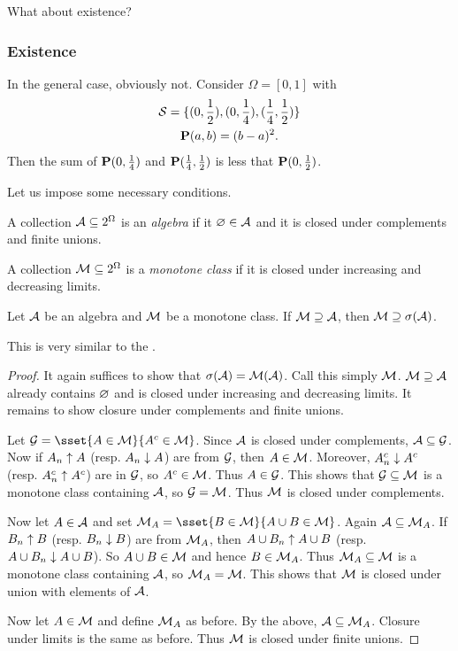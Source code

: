 What about existence?
\subsubsection{Existence}
In the general case, obviously not.
Consider $\Omega = [0, 1]$ with
\begin{gather*}
    \mcS = \set{(0, \frac12), (0, \frac14), (\frac14, \frac12)} \\
    \P(a, b) = (b - a)^2.
\end{gather*} Then the sum of $\P(0, \frac14)$ and $\P(\frac14, \frac12)$ is
less that $\P(0, \frac12)$.

Let us impose some necessary conditions.
\begin{definition*}[algebra] \label{def:algebra}
    A collection $\mcA \subseteq 2^\Omega$ is an \emph{algebra} if it
    $\O \in \mcA$ and it is closed under complements and finite unions.
\end{definition*}
\begin{definition*} \label{def:monotone-class}
    A collection $\mcM \subseteq 2^\Omega$ is a \emph{monotone class} if it
    is closed under increasing and decreasing limits.
\end{definition*}

\begin{proposition} \label{thm:monotone-algebra}
    Let $\mcA$ be an algebra and $\mcM$ be a monotone class.
    If $\mcM \supseteq \mcA$, then $\mcM \supseteq \sigma(\mcA)$.
\end{proposition}
This is very similar to the .
\begin{proof}
    It again suffices to show that $\sigma(\mcA) = \mcM(\mcA)$.
    Call this simply $\mcM$.
    $\mcM \supseteq \mcA$ already contains $\O$ and is closed under
    increasing and decreasing limits.
    It remains to show closure under complements and finite unions.

    Let $\mcG = \sset{A \in \mcM}{A^c \in \mcM}$.
    Since $\mcA$ is closed under complements, $\mcA \subseteq \mcG$.
    Now if $A_n \upto A$ (resp. $A_n \downto A$) are from $\mcG$,
    then $A \in \mcM$.
    Moreover, $A_n^c \downto A^c$ (resp. $A_n^c \upto A^c$) are in $\mcG$,
    so $A^c \in \mcM$.
    Thus $A \in \mcG$.
    This shows that $\mcG \subseteq \mcM$ is a monotone class containing
    $\mcA$, so $\mcG = \mcM$.
    Thus $\mcM$ is closed under complements.

    Now let $A \in \mcA$ and set
    $\mcM_A = \sset{B \in \mcM}{A \cup B \in \mcM}$.
    Again $\mcA \subseteq \mcM_A$.
    If $B_n \upto B$ (resp. $B_n \downto B$) are from $\mcM_A$,
    then $A \cup B_n \upto A \cup B$ (resp. $A \cup B_n \downto A \cup B$).
    So $A \cup B \in \mcM$ and hence $B \in \mcM_A$.
    Thus $\mcM_A \subseteq \mcM$ is a monotone class containing $\mcA$, so
    $\mcM_A = \mcM$.
    This shows that $\mcM$ is closed under union with elements of $\mcA$.

    Now let $A \in \mcM$ and define $\mcM_A$ as before.
    By the above, $\mcA \subseteq \mcM_A$.
    Closure under limits is the same as before.
    Thus $\mcM$ is closed under finite unions.
\end{proof}

